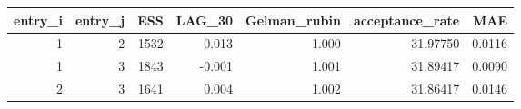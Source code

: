 \begin{longtable}{rrrrrrr}
\toprule
entry\_i & entry\_j & ESS & LAG\_30 & Gelman\_rubin & acceptance\_rate & MAE \\ 
\midrule
1 & 2 & 1532 & 0.013 & 1.000 & 31.97750 & 0.0116 \\ 
1 & 3 & 1843 & -0.001 & 1.001 & 31.89417 & 0.0090 \\ 
2 & 3 & 1641 & 0.004 & 1.002 & 31.86417 & 0.0146 \\ 
\bottomrule
\end{longtable}

